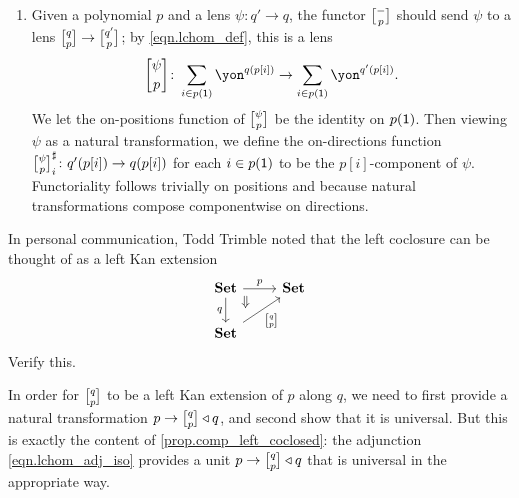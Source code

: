 \documentclass[Book-Poly]{subfiles}
\begin{document}
\begin{exercise}
\begin{solution}
\begin{enumerate}
    \item Given a polynomial $p$ and a lens $\psi\colon q'\to q$, the functor $\lchom{-}{p}$ should send $\psi$ to a lens $\lchom{q}{p}\to\lchom{q'}{p}$; by \eqref{eqn.lchom_def}, this is a lens
    \[
        \lchom{\psi}{p}\colon\sum_{i\in p(\1)}\yon^{q(p[i])}\to\sum_{i\in p(\1)}\yon^{q'(p[i])}.
    \]
    We let the on-positions function of $\lchom{\psi}{p}$ be the identity on $p(\textsf{1})$.
    Then viewing $\psi$ as a natural transformation, we define the on-directions function $\lchom{\psi}{p}^\sharp_i\colon q'(p[i])\to q(p[i])$ for each $i\in p(\textsf{1})$ to be the $p[i]$-component of $\psi$.
    Functoriality follows trivially on positions and because natural transformations compose componentwise on directions.
\end{enumerate}
\end{solution}
\end{exercise}

\begin{exercise}
In personal communication, Todd Trimble noted that the left coclosure can be thought of as a left Kan extension
\[
\begin{tikzcd}
	\smset\ar[r, "p"]\ar[d, "q"']\ar[dr, phantom, very near start, "\Downarrow"]&
	\smset\\
	\smset\ar[ur, "\lchom{q}{p}"']&~
\end{tikzcd}
\]
Verify this.
\end{exercise}
\begin{solution}
In order for $\lchom{q}{p}$ to be a left Kan extension of $p$ along $q$, we need to first provide a natural transformation $p\to \lchom{q}{p}\tri q$, and second show that it is universal. But this is exactly the content of \cref{prop.comp_left_coclosed}: the adjunction \eqref{eqn.lchom_adj_iso} provides a unit $p\to \lchom{q}{p}\tri q$ that is universal in the appropriate way. 
\end{solution}
\end{document}
